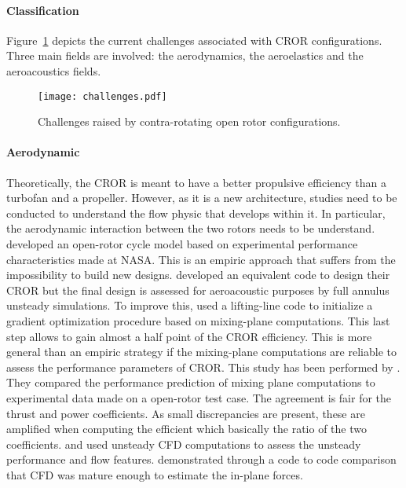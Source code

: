 
\paragraph{Classification}
Figure~\ref{fig:cror_challenges} depicts the current challenges associated
with CROR configurations. Three main fields are involved: the aerodynamics, the
aeroelastics and the aeroacoustics fields.
\begin{figure}[htbp]
  \centering
  \texttt{[image: challenges.pdf]}
  \caption{Challenges raised by contra-rotating open rotor configurations.}
  \label{fig:cror_challenges}
\end{figure}

\paragraph{Aerodynamic}
Theoretically, 
the CROR is meant to have a better propulsive efficiency than a turbofan and a
propeller. However, as it is a new architecture, studies need to be conducted
to understand the flow physic that develops within it. In particular,
the aerodynamic interaction between the two rotors needs to be understand.
\citet{Hendricks2011} developed an open-rotor cycle model based
on experimental performance characteristics made at NASA. This is 
an empiric approach that suffers from the impossibility to build new designs.
\citet{Peters2012} developed an equivalent code to design their CROR but the
final design is assessed for aeroacoustic purposes by full annulus unsteady simulations.
To improve this, \citet{Bechet2011} used a lifting-line code to
initialize a gradient optimization procedure based on mixing-plane
computations. This last step allows to gain almost a half point of
the CROR efficiency. This is more general than an empiric strategy
if the mixing-plane computations are reliable to assess the performance
parameters of CROR. This study has been performed by \citet{Zachariadis2011}.
They compared the performance prediction of mixing plane computations
to experimental data made on a open-rotor test case.
The agreement is fair for the thrust and power coefficients.
As small discrepancies are present, these are amplified when computing
the efficient which basically the ratio of the two coefficients.
\citet{Vion2011} and \citet{Stuermer2008} used unsteady
CFD computations to assess the unsteady performance and flow features.
\citet{Stuermer2008} \citet{Francois2013} demonstrated through a code to code comparison
that CFD was mature enough to estimate the in-plane forces.

